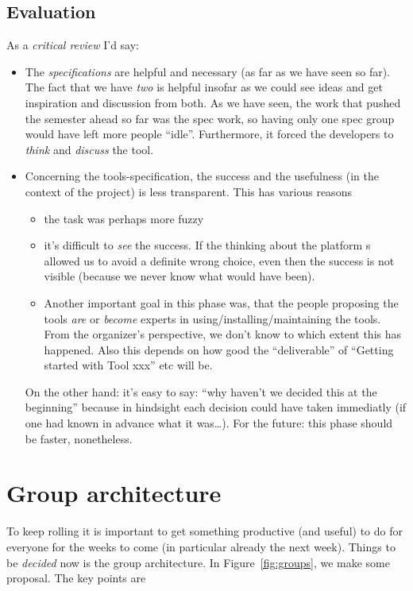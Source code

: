 \documentclass[11pt,handout]{handout}
\begin{document}
\subsection*{Evaluation}

As a \emph{critical review} I'd say:


\begin{itemize}
\item The \emph{specifications} are helpful and necessary (as far as we
  have seen so far). The fact that we have \emph{two} is helpful insofar as
  we could see ideas and get inspiration and discussion from both. As we
  have seen, the work that pushed the semester ahead so far was the spec
  work, so having only one spec group would have left more people ``idle''.
  Furthermore, it forced the developers to \emph{think} and \emph{discuss}
  the tool.
\item Concerning the tools-specification, the success and the usefulness
  (in the context of the project) is less transparent. This has various
  reasons
  \begin{itemize}
  \item the task was perhaps more fuzzy
  \item it's difficult to \emph{see} the success. If the thinking about the
    platform s allowed us to avoid a definite wrong choice, even then the
    success is not visible (because we never know what would have been).
  \item Another important goal in this phase was, that the people proposing
    the tools \emph{are} or \emph{become} experts in
    using/installing/maintaining the tools. From the organizer's
    perspective, we don't know to which extent this has happened. Also this
    depends on how good the ``deliverable'' of ``Getting started with Tool
    xxx'' etc will be.
  \end{itemize}
  On the other hand: it's easy to say: ``why haven't we decided this at the
  beginning'' because in hindsight each decision could have taken
  immediatly (if one had known in advance what it was\ldots). For the
  future: this phase should be faster, nonetheless.
\end{itemize}




\section*{Group architecture}


To keep rolling it is important to get something productive (and useful) to
do for everyone for the weeks to come (in particular already the next
week). Things to be \emph{decided} now is the group architecture. In
Figure~\ref{fig:groups}, we make some proposal. The key points are
\end{document}
